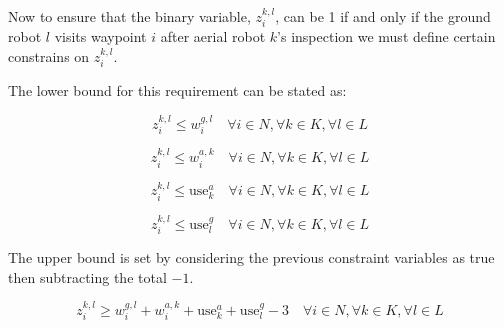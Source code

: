 \documentclass{article}
\begin{document}
				

				\begin{comment}
					These four constraints ensure that z_i^{k,l} can only be 1 if all of the following are true:

					Ground robot l visits waypoint i (w_i^{g,l} = 1)
					Aerial robot k visits waypoint i (w_i^{a,k} = 1)
					Aerial robot k is being used (use_k^a = 1)
					Ground robot l is being used (use_l^g = 1)
				\end{comment}

				Now to ensure that the binary variable, $z_i^{k,l}$, can be 1 if and only if the ground robot $l$ visits waypoint $i$ after aerial robot $k$'s inspection we must define certain constrains on $z_i^{k,l}$.

				\begin{comment}
					z_i^{k,l} = 1 if and only if (w_i^{g,l} = 1 AND w_i^{a,k} = 1 AND use_k^a = 1 AND use_l^g = 1)
				\end{comment}


				The lower bound for this requirement can be stated as:

				\begin{equation}
					z_i^{k,l} \leq w_i^{g,l} \quad \forall i \in N, \forall k \in K, \forall l \in L
				\end{equation}

				\begin{equation}
					z_i^{k,l} \leq w_i^{a,k} \quad \forall i \in N, \forall k \in K, \forall l \in L
				\end{equation}

				\begin{equation}
					z_i^{k,l} \leq \text{use}_k^a \quad \forall i \in N, \forall k \in K, \forall l \in L
				\end{equation}

				\begin{equation}
					z_i^{k,l} \leq \text{use}_l^g \quad \forall i \in N, \forall k \in K, \forall l \in L
				\end{equation}

				The upper bound is set by considering the previous constraint variables as true then subtracting the total $- 1$.

				\begin{equation}
					z_i^{k,l} \geq w_i^{g,l} + w_i^{a,k} + \text{use}_k^a + \text{use}_l^g - 3 \quad \forall i \in N, \forall k \in K, \forall l \in L
				\end{equation}
\end{document}
